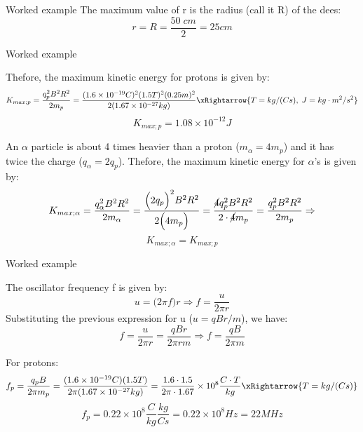 {\begin{frame}{Worked example}
The maximum value of r is the radius (call it R) of the dees:
\begin{equation*}
  r = R = \frac{50\;cm}{2} = 25 cm
\end{equation*}

\end{frame}

%
%
%

\begin{frame}{Worked example}

Thefore, the maximum kinetic energy for protons is given by:
\begin{equation*}
  K_{max;p}  = \frac{q_{p}^2 B^2 R^2}{2m_p}
                 = \frac{(1.6 \times 10^{-19} C)^2 (1.5T)^2 (0.25m)^2}{2(1.67 \times 10^{-27} kg)}
                     \xRightarrow{T = kg/(C s),\; J = kg \cdot m^2 / s^2}
\end{equation*}
\begin{equation*}
  K_{max;p} = 1.08 \times 10^{-12} J
\end{equation*}

An $\alpha$ particle is about 4 times heavier than a proton ($m_{\alpha} = 4 m_{p}$) and it has twice the charge ($q_{\alpha} = 2 q_{p}$).
Thefore, the maximum kinetic energy for $\alpha$'s is given by:
\begin{equation*}
  K_{max;\alpha}  = \frac{q_{\alpha}^2 B^2 R^2}{2m_{\alpha}} = \frac{\Big(2q_{p}\Big)^2 B^2 R^2}{2\Big(4m_p\Big)} =
       \frac{\cancel{4}q_{p}^2 B^2 R^2}{2 \cdot \cancel{4} m_p} = \frac{q_{p}^2 B^2 R^2}{2m_p} \Rightarrow
\end{equation*}
\begin{equation*}
  K_{max;\alpha}  =  K_{max;p}
\end{equation*}

\end{frame}

%
%
%

\begin{frame}{Worked example}

The oscillator frequency f is given by:
\begin{equation*}
  u = \Big( 2\pi f\Big) r \Rightarrow f = \frac{u}{2\pi r}
\end{equation*}
Substituting the previous expression for u ($u = q B r/m$), we have:
\begin{equation*}
 f = \frac{u}{2\pi r} = \frac{q B r }{2\pi r m} \Rightarrow
 f = \frac{q B}{2\pi m}
\end{equation*}

For protons:
\begin{equation*}
 f_{p} = \frac{q_p B}{2\pi m_p}
        = \frac{(1.6 \times 10^{-19} C)  (1.5 T)}{2\pi (1.67 \times 10^{-27} kg)}
        = \frac{1.6 \cdot 1.5}{2\pi \cdot 1.67}  \times 10^{8} \frac{C \cdot T}{kg} \xRightarrow{T = kg/(C s)}
\end{equation*}
\begin{equation*}
 f_{p} =  0.22  \times 10^{8} \frac{C}{kg}\frac{kg}{Cs} = 0.22  \times 10^{8} Hz = 22 MHz
\end{equation*}


\end{frame}}
